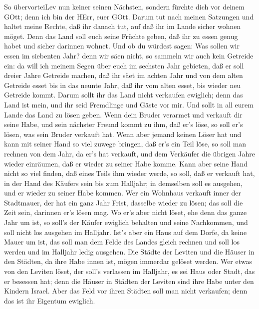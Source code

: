  So übervorteiLev nun keiner seinen Nächsten, sondern
fürchte dich vor deinem GOtt; denn ich bin der HErr, euer GOtt.
 Darum tut nach meinen Satzungen und haltet meine Rechte,
daß ihr danach tut, auf daß ihr im Lande sicher wohnen möget.
 Denn das Land soll euch seine Früchte geben, daß ihr zu
essen genug habet und sicher darinnen wohnet.  Und ob du
würdest sagen: Was sollen wir essen im siebenten Jahr? denn wir säen
nicht, so sammeln wir auch kein Getreide ein:  da will ich
meinem Segen über euch im sechsten Jahr gebieten, daß er soll dreier
Jahre Getreide machen,  daß ihr säet im achten Jahr und von
dem alten Getreide esset bis in das neunte Jahr, daß ihr vom alten
esset, bis wieder neu Getreide kommt.  Darum sollt ihr das
Land nicht verkaufen ewiglich; denn das Land ist mein, und ihr seid
Fremdlinge und Gäste vor mir.  Und sollt in all eurem Lande
das Land zu lösen geben.  Wenn dein Bruder verarmet und
verkauft dir seine Habe, und sein nächster Freund kommt zu ihm, daß er's
löse, so soll er's lösen, was sein Bruder verkauft hat. 
Wenn aber jemand keinen Löser hat und kann mit seiner Hand so viel
zuwege bringen, daß er's ein Teil löse,  so soll man
rechnen von dem Jahr, da er's hat verkauft, und dem Verkäufer die
übrigen Jahre wieder einräumen, daß er wieder zu seiner Habe komme.
 Kann aber seine Hand nicht so viel finden, daß eines Teils
ihm wieder werde, so soll, daß er verkauft hat, in der Hand des Käufers
sein bis zum Halljahr; in demselben soll es ausgehen, und er wieder zu
seiner Habe kommen.  Wer ein Wohnhaus verkauft inner der
Stadtmauer, der hat ein ganz Jahr Frist, dasselbe wieder zu lösen; das
soll die Zeit sein, darinnen er's lösen mag.  Wo er's aber
nicht löset, ehe denn das ganze Jahr um ist, so soll's der Käufer
ewiglich behalten und seine Nachkommen, und soll nicht los ausgehen im
Halljahr.  Ist's aber ein Haus auf dem Dorfe, da keine
Mauer um ist, das soll man dem Felde des Landes gleich rechnen und soll
los werden und im Halljahr ledig ausgehen.  Die Städte der
Leviten und die Häuser in den Städten, da ihre Habe innen ist, mögen
immerdar gelöset werden.  Wer etwas von den Leviten löset,
der soll's verlassen im Halljahr, es sei Haus oder Stadt, das er
besessen hat; denn die Häuser in Städten der Leviten sind ihre Habe
unter den Kindern Israel.  Aber das Feld vor ihren Städten
soll man nicht verkaufen; denn das ist ihr Eigentum ewiglich.
